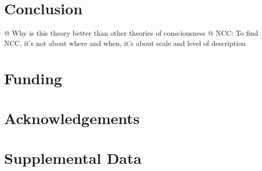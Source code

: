 \documentclass[utf8]{article}
\begin{document}
	\section{Conclusion}
		\begin{ants}
			@ Why is this theory better than other theories of consciousness
			@ NCC: To find NCC, it's not about where and when, it's about scale and level of description
		\end{ants}




	\section*{Funding}

	\section*{Acknowledgements}

	\section*{Supplemental Data}

	
	
\end{document}
